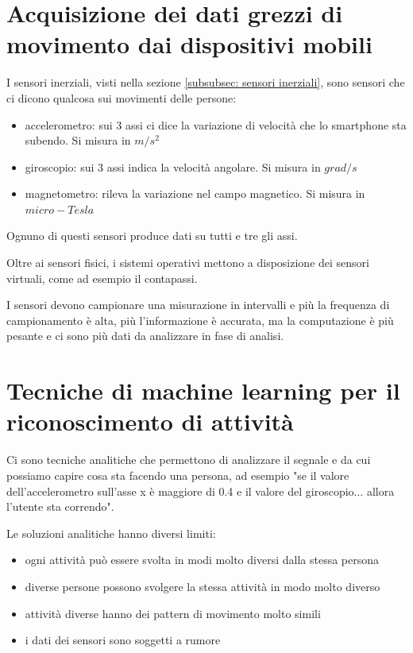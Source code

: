 \section{Acquisizione dei dati grezzi di movimento dai dispositivi mobili}
I sensori inerziali, visti nella sezione \ref{subsubsec: sensori inerziali}, sono sensori che ci dicono qualcosa sui movimenti delle persone:
\begin{itemize}
    \item accelerometro: sui 3 assi ci dice la variazione di velocità che lo smartphone sta subendo. Si misura in $m/s^2$
    \item giroscopio: sui 3 assi indica la velocità angolare. Si misura in $grad/s$
    \item magnetometro: rileva la variazione nel campo magnetico. Si misura in $micro-Tesla$
\end{itemize} 
Ognuno di questi sensori produce dati su tutti e tre gli assi. 

Oltre ai sensori fisici, i sistemi operativi mettono a disposizione dei sensori virtuali, come ad esempio il contapassi. 

I sensori devono campionare una misurazione in intervalli e più la frequenza di campionamento è alta, più l'informazione è accurata, ma la computazione è più pesante e ci sono più dati da analizzare in fase di analisi. 

\section[Tecniche di machine learning per il riconoscimento di attività]{Tecniche di machine learning per il \\riconoscimento di attività}

Ci sono tecniche analitiche che permettono di analizzare il segnale e da cui possiamo capire cosa sta facendo una persona, ad esempio "se il valore dell'accelerometro sull'asse x è maggiore di 0.4 e il valore del giroscopio... allora l’utente sta correndo".

Le soluzioni analitiche hanno diversi limiti: 
\begin{itemize}
    \item ogni attività può essere svolta in modi molto diversi dalla stessa persona
    \item diverse persone possono svolgere la stessa attività in modo molto diverso
    \item attività diverse hanno dei pattern di movimento molto simili
    \item i dati dei sensori sono soggetti a rumore
\end{itemize} 

